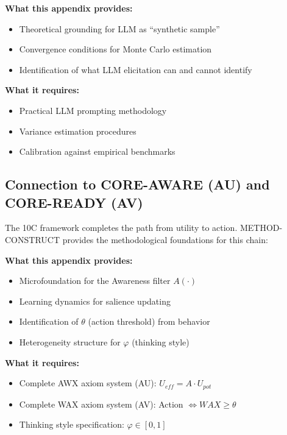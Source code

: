 \begin{tcolorbox}[colback=yellow!5!white, colframe=yellow!75!black,
    title=Integration: METHOD-CONSTRUCT $\leftrightarrow$ METHOD-LLMMC (AN)]
\textbf{What this appendix provides:}
\begin{itemize}[nosep]
\item Theoretical grounding for LLM as ``synthetic sample''
\item Convergence conditions for Monte Carlo estimation
\item Identification of what LLM elicitation can and cannot identify
\end{itemize}

\textbf{What it requires:}
\begin{itemize}[nosep]
\item Practical LLM prompting methodology
\item Variance estimation procedures
\item Calibration against empirical benchmarks
\end{itemize}
\end{tcolorbox}

\subsection{Connection to CORE-AWARE (AU) and CORE-READY (AV)}

The 10C framework completes the path from utility to action. METHOD-CONSTRUCT
provides the methodological foundations for this chain:

\begin{tcolorbox}[colback=yellow!5!white, colframe=yellow!75!black,
    title=Integration: METHOD-CONSTRUCT $\leftrightarrow$ CORE-AWARE/READY (AU, AV)]
\textbf{What this appendix provides:}
\begin{itemize}[nosep]
\item Microfoundation for the Awareness filter $A(\cdot)$
\item Learning dynamics for salience updating
\item Identification of $\theta$ (action threshold) from behavior
\item Heterogeneity structure for $\varphi$ (thinking style)
\end{itemize}

\textbf{What it requires:}
\begin{itemize}[nosep]
\item Complete AWX axiom system (AU): $U_{eff} = A \cdot U_{pot}$
\item Complete WAX axiom system (AV): Action $\Leftrightarrow WAX \geq \theta$
\item Thinking style specification: $\varphi \in [0,1]$
\end{itemize}
\end{tcolorbox}

